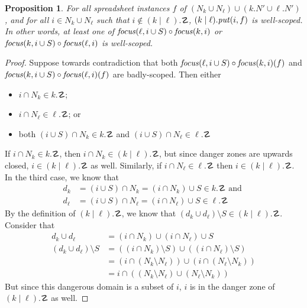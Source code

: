 \documentclass{article}
\newtheorem{proposition}{Proposition}
\begin{document}
\begin{proposition}
    For all spreadsheet instances $f$ of $(N_k \cup N_\ell) \cup (k.N' \cup \ell.N')$, and
    for all $i \in N_k \cup N_\ell$ such that $i \not\in (k\mid\ell).\danger$,
    $(k\mid\ell).\mathit{put}(i,f)$ is well-scoped. In other words, at least one of
    $\mathit{focus}(\ell,i\cup S) \circ \mathit{focus}(k,i)$ or 
    $\mathit{focus}(k,i\cup S) \circ \mathit{focus}(\ell,i)$ is well-scoped.
\end{proposition}
\begin{proof}
    Suppose towards contradiction that both 
    $\mathit{focus}(\ell,i\cup S) \circ \mathit{focus}(k,i)(f)$
    and $\mathit{focus}(k,i\cup S) \circ \mathit{focus}(\ell,i)(f)$ are badly-scoped. 
    Then either
    \begin{itemize}
        \item $i \cap N_k \in k.\danger$;
        \item $i \cap N_\ell \in \ell.\danger$; or
        \item both $(i \cup S) \cap N_k \in k.\danger$ and $(i \cup S) \cap N_\ell \in \ell.\danger$ 
    \end{itemize}
    If $i \cap N_k \in k.\danger$, then $i \cap N_k \in (k\mid\ell).\danger$,
    but since danger zones are upwards closed, $i \in (k\mid\ell).\danger$ as well.
    Similarly, if $i \cap N_\ell \in \ell.\danger$ then $i \in (k\mid\ell).\danger$.
    In the third case, we know that
    \begin{align*}
        d_k &= (i \cup S) \cap N_k = (i \cap N_k) \cup S \in k.\danger \text{ and }\\
        d_\ell &= (i \cup S) \cap N_\ell = (i \cap N_\ell) \cup S \in \ell.\danger
    \end{align*}
    By the definition of $(k\mid\ell).\danger$, we know that
    $(d_k \cup d_\ell) \setminus S \in (k\mid\ell).\danger$.
    Consider that
    \begin{align*}
        d_k \cup d_\ell &= (i \cap N_k) \cup (i \cap N_\ell) \cup S \\
        (d_k \cup d_\ell) \setminus S &= ((i \cap N_k) \setminus S) \cup ((i \cap N_\ell) \setminus S) \\
        &= (i \cap (N_k \setminus N_\ell)) \cup (i \cap (N_\ell \setminus N_k)) \\
        &= i \cap ((N_k \setminus N_\ell) \cup (N_\ell \setminus N_k))
    \end{align*}
    But since this dangerous domain is a subset of $i$, $i$ is in the danger 
    zone of $(k\mid\ell).\danger$ as well.
\end{proof}
\end{document}
